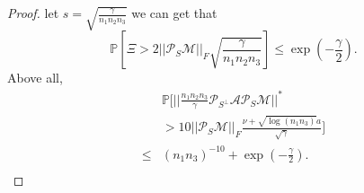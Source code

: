 \documentclass[journal,transmag]{IEEEtran}
\theoremstyle{plain}
\begin{document}
\begin{proof}
let $s = \sqrt{\frac{\gamma}{n_1 n_2 n_3}}$ we can get that
\begin{equation}
\mathbb{P}[\Xi > 2||\mathcal{P}_S  \mathcal{M}||_F \sqrt{\frac{\gamma}{n_1 n_2 n_3}}]\le \exp(-\frac{\gamma}{2}).
\end{equation}
Above all,
\begin{equation}
\begin{split}
&\mathbb{P}[||\frac{n_1 n_2 n_3}{\gamma}\mathcal{P}_{S^{\bot}} \mathcal{A}\mathcal{P}_S\mathcal{M}||^{*}\\
&>10 ||\mathcal{P}_S\mathcal{M}||_F \frac{\nu+\sqrt{\log(n_1 n_3)}a}{\sqrt{\gamma}}] \\
\le &(n_1 n_3)^{-10}+\exp(-\frac{\gamma}{2}).\\
\end{split}
\end{equation}
\end{proof}
\end{document}
